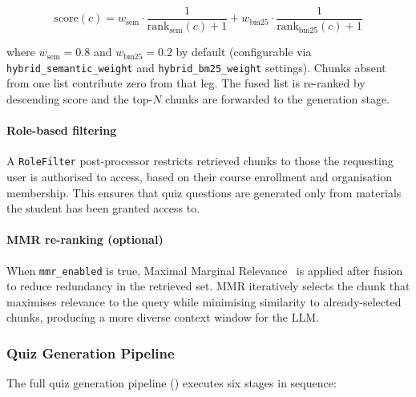 \begin{equation}
    \text{score}(c) = w_{\text{sem}} \cdot \frac{1}{\text{rank}_{\text{sem}}(c) + 1} + w_{\text{bm25}} \cdot \frac{1}{\text{rank}_{\text{bm25}}(c) + 1}
\end{equation}

where $w_{\text{sem}} = 0.8$ and $w_{\text{bm25}} = 0.2$ by default (configurable via \texttt{hybrid\_semantic\_weight} and \texttt{hybrid\_bm25\_weight} settings). Chunks absent from one list contribute zero from that leg. The fused list is re-ranked by descending score and the top-$N$ chunks are forwarded to the generation stage.

\paragraph{Role-based filtering}
A \texttt{RoleFilter} post-processor restricts retrieved chunks to those the requesting user is authorised to access, based on their course enrollment and organisation membership. This ensures that quiz questions are generated only from materials the student has been granted access to.

\paragraph{MMR re-ranking (optional)}
When \texttt{mmr\_enabled} is true, Maximal Marginal Relevance~\cite{carbonell1998mmr} is applied after fusion to reduce redundancy in the retrieved set. MMR iteratively selects the chunk that maximises relevance to the query while minimising similarity to already-selected chunks, producing a more diverse context window for the LLM.

\subsubsection{Quiz Generation Pipeline}
\label{sec:impl_quiz_pipeline}

The full quiz generation pipeline () executes six stages in sequence:

